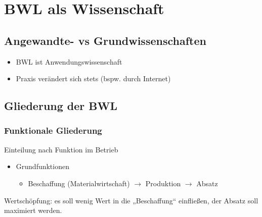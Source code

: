 \newcommand{\customDir}{../}








%



\maketitle
\newpage
\tableofcontents
\newpage


\chapter{BWL als Wissenschaft}
\section{Angewandte- vs Grundwissenschaften}
\begin{itemize}
\item BWL ist Anwendungswissenschaft
\item Praxis verändert sich stets (bspw. durch Internet)
\end{itemize}
\section{Gliederung der BWL}
\subsection{Funktionale Gliederung}
Einteilung nach Funktion im Betrieb
\begin{itemize}
\item Grundfunktionen
\begin{itemize}
\item Beschaffung (Materialwirtschaft) $\rightarrow$ Produktion $\rightarrow$ Absatz
\end{itemize}
\end{itemize}
Wertschöpfung: es soll wenig Wert in die „Beschaffung“ einfließen, der Absatz soll maximiert werden.
